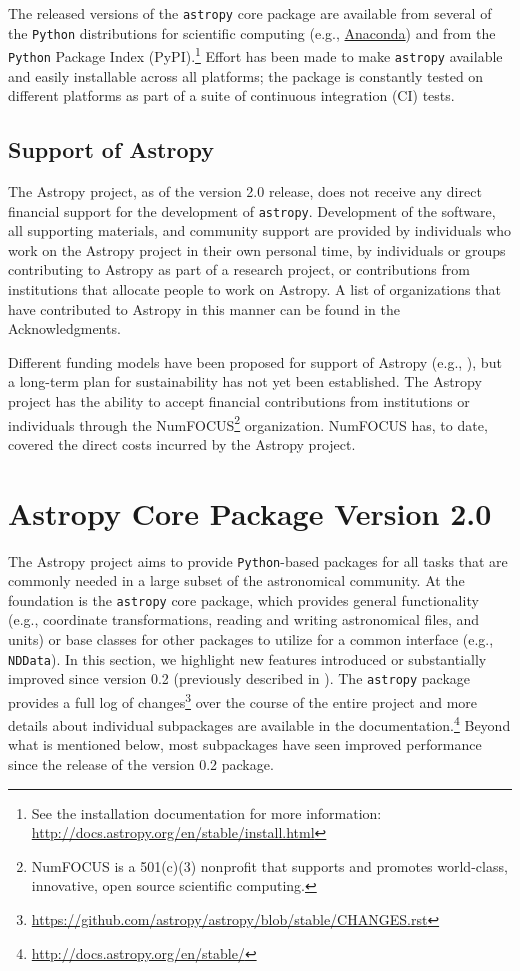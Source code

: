 \documentclass[modern]{aastex61}
\newcommand{\package}[1]{\texttt{#1}\xspace}
\newcommand{\python}{\package{Python}}
\newcommand{\astropy}{Astropy\xspace}
\newcommand{\astropypkg}{\package{astropy}}
\begin{document}
The released versions of the \astropypkg core package are available from several
of the \python distributions for scientific computing (e.g.,
\href{http://anaconda.org}{Anaconda}) and from the \python Package Index
(PyPI).\footnote{See the installation documentation for more information:
\url{http://docs.astropy.org/en/stable/install.html}}
Effort has been made to make \astropypkg available and easily installable across
all platforms; the package is constantly tested on different platforms as part
of a suite of continuous integration (CI) tests.

\subsection{Support of Astropy}

The \astropy project, as of the version 2.0 release, does not receive any direct
financial support for the development of \astropypkg.
Development of the software, all supporting materials, and community support are
provided by individuals who work on the \astropy project in their own personal
time, by individuals or groups contributing to \astropy as part of a research
project, or contributions from institutions that allocate people to work on
\astropy.
A list of organizations that have contributed to \astropy in this manner
can be found in the Acknowledgments.

Different funding models have been proposed for support of \astropy
(e.g., \citealt{2016arXiv161003159M}), but a long-term plan
for sustainability has not yet been established.
The \astropy project has the ability to accept financial contributions
from institutions or individuals through the NumFOCUS\footnote{NumFOCUS
is a 501(c)(3) nonprofit that supports and promotes world-class, innovative,
open source scientific computing.} organization. NumFOCUS has, to date, covered the direct costs incurred by the \astropy project.

\section{Astropy Core Package Version 2.0}
\label{sec:core}
The \astropy project aims to provide \python-based packages for all tasks that
are commonly needed in a large subset of the astronomical community.
At the foundation is the \astropypkg core package, which provides general
functionality (e.g., coordinate transformations, reading and writing
astronomical files, and units) or base classes for other
packages to utilize for a common interface (e.g., \texttt{NDData}).
In this section, we highlight new features introduced or substantially improved
since version 0.2 (previously described in \citealt{astropy}).  The \astropypkg
package
provides a full log of changes\footnote{\url{https://github.com/astropy/astropy/blob/stable/CHANGES.rst}}
over the course of the entire project and more details about individual
subpackages are available in the documentation.\footnote{\url{http://docs.astropy.org/en/stable/}}
Beyond what is mentioned below, most subpackages have seen improved performance
since the release of the version 0.2 package.
\end{document}
